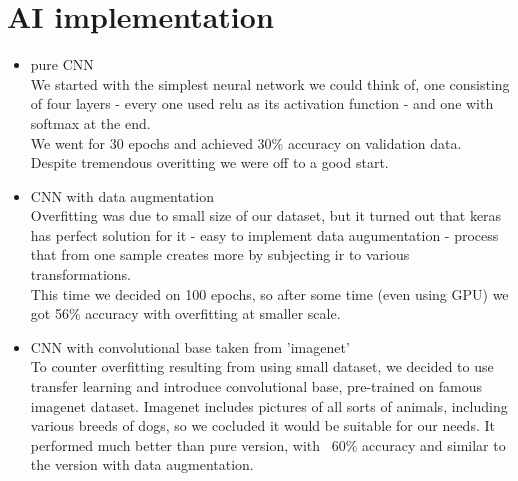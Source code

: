 \documentclass[11pt]{diazessay} %
\begin{document}
\section*{AI implementation}
\begin{itemize}

	\item pure CNN \\
We started with the simplest neural network we could think of, one consisting of four layers - every one used relu as its activation function - and one with softmax at the end. \\We went for 30 epochs and achieved 30\% accuracy on validation data. Despite tremendous overitting we were off to a good start.  
	\item CNN with data augmentation \\
Overfitting was due to small size of our dataset, but it turned out that keras has perfect solution for it - easy to implement data augumentation - process that from one sample creates more by subjecting ir to various transformations. \\
This time we decided on 100 epochs, so after some time (even using GPU) we got 56\% accuracy with overfitting at smaller scale.   
	\item CNN with convolutional base taken from 'imagenet' \\
	To counter overfitting resulting from using small dataset, we decided to use transfer learning and introduce convolutional base, pre-trained on famous imagenet dataset. Imagenet includes pictures of all sorts of animals, including various breeds of dogs, so we cocluded it would be suitable for our needs. It performed much better than pure version, with ~60\% accuracy and similar to the version with data augmentation.
	\begin{figure}[h]
 

\end{figure}
\end{itemize}
\end{document}
